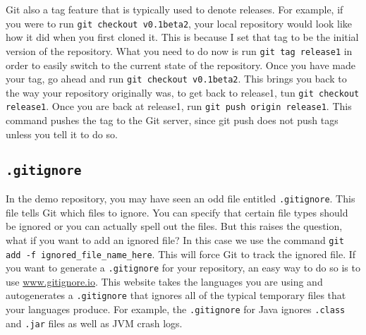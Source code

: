 \documentclass[notitlepage]{simple}
\begin{document}
Git also a tag feature that is typically used to denote releases.
For example, if you were to run \verb|git checkout v0.1beta2|, your local repository would look like how it did when you first cloned it.
This is because I set that tag to be the initial version of the repository.
What you need to do now is run \verb|git tag release1| in order to easily switch to the current state of the repository.
Once you have made your tag, go ahead and run \verb|git checkout v0.1beta2|.
This brings you back to the way your repository originally was, to get back to release1, tun \verb|git checkout release1|.
Once you are back at release1, run \verb|git push origin release1|.
This command pushes the tag to the Git server, since git push does not push tags unless you tell it to do so.

\subsection{\texttt{.gitignore}}

In the demo repository, you may have seen an odd file entitled \verb|.gitignore|.
This file tells Git which files to ignore.
You can specify that certain file types should be ignored or you can actually spell out the files.
But this raises the question, what if you want to add an ignored file?
In this case we use the command \verb|git add -f ignored_file_name_here|.
This will force Git to track the ignored file.
If you want to generate a \verb|.gitignore| for your repository, an easy way to do so is to use \url{www.gitignore.io}.
This website takes the languages you are using and autogenerates a \verb|.gitignore| that ignores all of the typical temporary files that your languages produce.
For example, the \verb|.gitignore| for Java ignores \verb|.class| and \verb|.jar| files as well as JVM crash logs.
\end{document}
